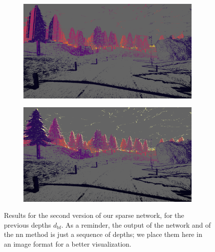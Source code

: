 \begin{figure}
\begin{subfigure}{0.49\linewidth}
    \label{subfig:delta:sparse_network_cmp:pred}
  \end{subfigure}
  \begin{subfigure}{0.49\linewidth}
    \includegraphics[width=\linewidth]{mainmatter/figures/5_depth_transf/sparse_network_cmp/nn_lightgray_fixed.png}
    \label{subfig:delta:sparse_network_cmp:nn}
  \end{subfigure}
  \begin{subfigure}{0.49\linewidth}
    \includegraphics[width=\linewidth]{mainmatter/figures/5_depth_transf/sparse_network_cmp/gtbf_lightgray_fixed.png}
    \label{subfig:delta:sparse_network_cmp:gt}
  \end{subfigure}
  \caption{Results for the second version of our sparse network, for the previous depths \(d_\text{bf}\). As a reminder, the output of the network and of the \acrshort{nn} method is just a sequence of depths; we place them here in an image format for a better visualization.}\label{fig:delta:sparse_network_cmp}
\end{figure}

